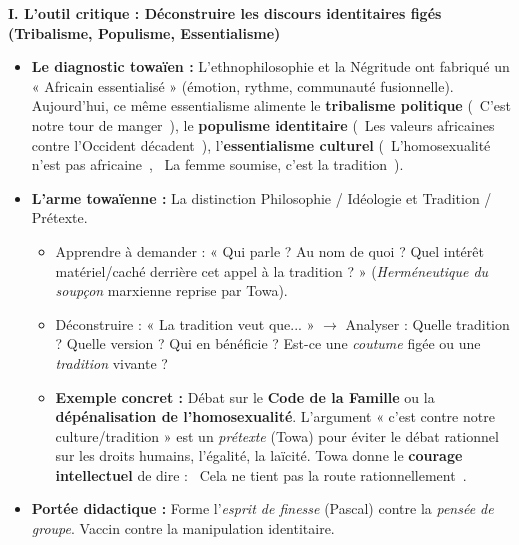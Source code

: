 \documentclass[11pt]{article}
\newcommand{\cle}[1]{{\popxbold\color{popdark}#1}}
\begin{document}
\begin{corrige}
\textbf{I. L'outil critique : Déconstruire les discours identitaires figés (Tribalisme, Populisme, Essentialisme)}
\begin{itemize}
\item \textbf{Le diagnostic towaïen :} L'ethnophilosophie et la Négritude ont fabriqué un « Africain essentialisé » (émotion, rythme, communauté fusionnelle). Aujourd'hui, ce même essentialisme alimente le \textbf{tribalisme politique} (\guillemotleft~C'est notre tour de manger~\guillemotright), le \textbf{populisme identitaire} (\guillemotleft~Les valeurs africaines contre l'Occident décadent~\guillemotright), l'\textbf{essentialisme culturel} (\guillemotleft~L'homosexualité n'est pas africaine~\guillemotright, \guillemotleft~La femme soumise, c'est la tradition~\guillemotright).
\item \textbf{L'arme towaïenne :} La distinction \cle{Philosophie / Idéologie} et \cle{Tradition / Prétexte}.
\begin{itemize}
\item Apprendre à demander : « Qui parle ? Au nom de quoi ? Quel intérêt matériel/caché derrière cet appel à la tradition ? » (\emph{Herméneutique du soupçon} marxienne reprise par Towa).
\item Déconstruire : « La tradition veut que... » $\rightarrow$ Analyser : Quelle tradition ? Quelle version ? Qui en bénéficie ? Est-ce une \emph{coutume} figée ou une \emph{tradition} vivante ?
\item \textbf{Exemple concret :} Débat sur le \textbf{Code de la Famille} ou la \textbf{dépénalisation de l'homosexualité}. L'argument « c'est contre notre culture/tradition » est un \emph{prétexte} (Towa) pour éviter le débat rationnel sur les droits humains, l'égalité, la laïcité. Towa donne le \textbf{courage intellectuel} de dire : \guillemotleft~Cela ne tient pas la route rationnellement~\guillemotright.
\end{itemize}
\item \textbf{Portée didactique :} Forme l'\emph{esprit de finesse} (Pascal) contre la \emph{pensée de groupe}. Vaccin contre la manipulation identitaire.
\end{itemize}


\end{corrige}
\end{document}
